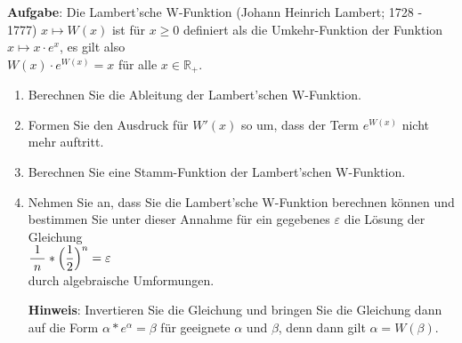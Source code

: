\documentclass{article}
\newcommand{\bruch}[2]{\displaystyle\frac{\;\displaystyle#1\;}{\;\displaystyle#2\;}}
\begin{document}
\pagebreak
\noindent
\textbf{Aufgabe}:  Die Lambert'sche W-Funktion (Johann Heinrich Lambert; 1728 - 1777)
$x \mapsto W(x)$ ist f\"ur $x\geq 0$ definiert als die Umkehr-Funktion der Funktion $x \mapsto x\cdot e^x$,
es gilt also 
\\[0.1cm]
\hspace*{1.3cm} $\displaystyle W(x) \cdot e^{W(x)} = x$ \quad f\"ur alle $x \in \mathbb{R}_+$.
\begin{enumerate}
\item Berechnen Sie die Ableitung der Lambert'schen W-Funktion.
\item Formen Sie den Ausdruck f\"ur $W'(x)$ so um, dass der Term $e^{W(x)}$ nicht mehr
      auftritt.
\item Berechnen Sie eine Stamm-Funktion der Lambert'schen W-Funktion.
\item Nehmen Sie an, dass Sie die Lambert'sche W-Funktion berechnen k\"onnen und
      bestimmen Sie unter dieser Annahme f\"ur ein gegebenes $\varepsilon$ die L\"osung der Gleichung 
      \\[0.1cm]
      \hspace*{1.3cm}
      $\bruch{1}{n} * \Bigl(\frac{1}{2}\Bigr)^n = \varepsilon$
      \\[0.1cm]
      durch algebraische Umformungen.

      \noindent
      \textbf{Hinweis}: Invertieren Sie die Gleichung und bringen Sie die Gleichung dann
      auf die Form $\alpha * e^\alpha = \beta$ f\"ur geeignete $\alpha$ und $\beta$, denn
      dann gilt $\alpha = W(\beta)$.
\end{enumerate}
\vspace*{0.3cm}
\end{document}
